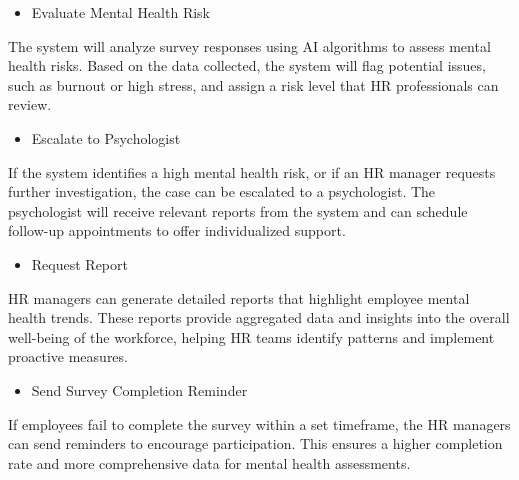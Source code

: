 \documentclass[conference]{IEEEtran}
\begin{document}
            \par
            
            \begin{itemize}
                \item Evaluate Mental Health Risk
            \end{itemize}
                
            The system will analyze survey responses using AI
            algorithms to assess mental health risks. Based on the data
            collected, the system will flag potential issues, such as burnout
            or high stress, and assign a risk level that HR professionals can
            review.
            \newline
            
            \begin{itemize}
                \item Escalate to Psychologist
            \end{itemize}
                    
            If the system identifies a high mental health risk, or if an
            HR manager requests further investigation, the case can be
            escalated to a psychologist. The psychologist will receive
            relevant reports from the system and can schedule follow-up
            appointments to offer individualized support.
            \newline
            
             \begin{itemize}
                 \item Request Report
             \end{itemize}
                        
             HR managers can generate detailed reports that highlight
             employee mental health trends. These reports provide
             aggregated data and insights into the overall well-being of the
             workforce, helping HR teams identify patterns and implement
             proactive measures.
            \newline
            
            \begin{itemize}
                \item Send Survey Completion Reminder
            \end{itemize}
                       
            If employees fail to complete the survey within a set
            timeframe, the HR managers can send reminders to encourage
            participation. This ensures a higher completion rate and more
            comprehensive data for mental health assessments.
            \newline
            
\end{document}
